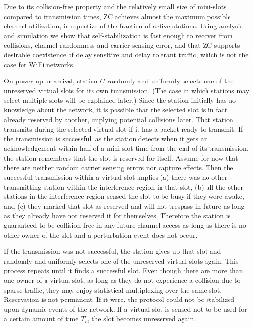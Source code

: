 \documentclass{acm_proc_article-sp}
\newcommand{\rt}{$T_{r}$\xspace}
\begin{document}
Due to its collision-free property and the relatively small size of mini-slots compared to transmission times, ZC achieves almost the maximum possible channel utilization, irrespective of the fraction of active stations. Using analysis and simulation we show that self-stabilization is fast enough to recover from collisions, channel randomness and carrier sensing error, and that ZC supports desirable coexistence of delay sensitive and delay tolerant traffic, which is not the case for WiFi networks.




On power up or arrival, station $C$ randomly and uniformly selects one of the unreserved virtual slots for its own transmission. (The case in which stations may select multiple slots will be explained later.) Since the station initially has no knowledge about the network, it is possible that the selected slot is in fact already reserved by another, implying potential collisions later. That station transmits during the selected virtual slot if it has a packet ready to transmit. If the transmission is successful, as the station detects when it gets an acknowledgement within half of a mini slot time from the end of its transmission, the station remembers that the slot is reserved for itself. Assume for now that there are neither random carrier sensing errors nor capture effects. Then the successful transmission within a virtual slot implies (a) there was no other transmitting station within the interference region in that slot, (b) all the other stations in the interference region sensed the slot to be busy if they were awake, and (c) they marked that slot as reserved and will not trespass in future as long as they already have not reserved it for themselves. Therefore the station is guaranteed to be collision-free in any future channel access as long as there is no other owner of the slot and a perturbation event does not occur.

If the transmission was not successful, the station gives up that slot and randomly and uniformly selects one of the unreserved virtual slots again. This process repeats until it finds a successful slot. Even though there are more than one owner of a virtual slot, as long as they do not experience a collision due to sparse traffic, they may enjoy statistical multiplexing over the same slot. Reservation is not permanent. If it were, the protocol could not be stabilized upon dynamic events of the network. If a virtual slot is sensed not to be used for a certain amount of time \rt, the slot becomes unreserved again.
\end{document}
